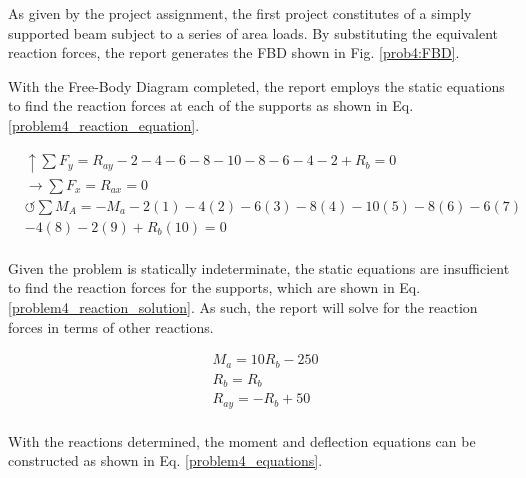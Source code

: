 \documentclass[a4paper]{article}
\begin{document}
As given by the project assignment, the first project constitutes of a simply supported beam subject to a series of area loads. By substituting the equivalent reaction forces, the report generates the FBD shown in Fig. \ref{prob4:FBD}.

With the Free-Body Diagram completed, the report employs the static equations to find the reaction forces at each of the supports as shown in Eq. \ref{problem4_reaction_equation}.

\begin{equation}
\begin{split}
	&\uparrow \sum F_y = R_{ay} -2 -4 -6 -8 -10 -8 -6 -4 -2 + R_b= 0 \\
 	&\rightarrow \sum F_x = R_{ax} = 0 \\
 	&\circlearrowleft \sum M_A = -M_a -2(1) -4(2) -6(3) -8(4) -10(5) -8(6) -6(7) \\
	& - 4(8) -2(9) + R_b(10) = 0 \\
\end{split}
\label{problem4_reaction_equation}
\end{equation}

Given the problem is statically indeterminate, the static equations are insufficient to find the reaction forces for the supports, which are shown in Eq. \ref{problem4_reaction_solution}. As such, the report will solve for the reaction forces in terms of other reactions.

\begin{equation}
\begin{split}
	& M_a = 10R_b - 250 \\
	& R_{b} = R_b \\
	& R_{ay} = -R_b + 50 \\
\end{split}
\label{problem4_reaction_solution}
\end{equation}

With the reactions determined, the moment and deflection equations can be constructed as shown in Eq. \ref{problem4_equations}.
\end{document}
